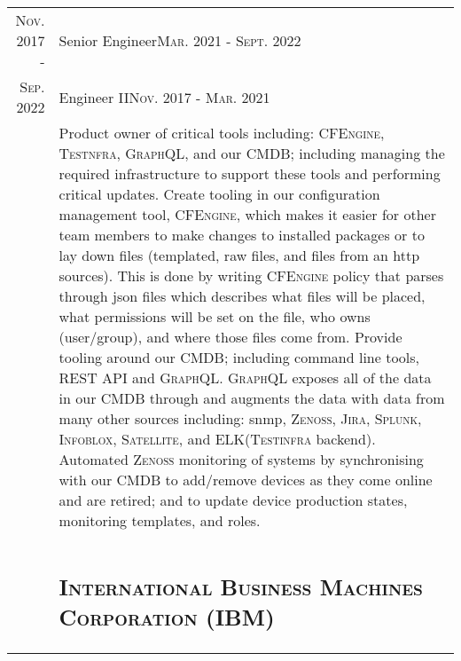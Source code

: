 \documentclass[letterpaper,10pt]{article}
\begin{document}
\begin{tabular}{R|B}
	\textsc{Nov.} 2017 -           & Senior Engineer\hfill\small{\textsc{Mar.} 2021 - \textsc{Sept.} 2022}                          \\
	\textsc{Sep.} 2022\phantom{ -} & Engineer II\hfill\small{\textsc{Nov.} 2017 - \textsc{Mar.} 2021}                               \\
	                               & \footnotesize Product owner of critical tools including: \textsc{CFEngine, Testnfra, GraphQL},
	and our CMDB; including managing the required infrastructure to support these tools and performing 	critical updates.
	Create tooling in our configuration management tool, \textsc{CFEngine}, which makes it easier for other team members
	to make changes to installed packages or to lay down files (templated, raw files, and files from an http sources).
	This is done by writing \textsc{CFEngine} policy that parses through json files which describes what files will be placed,
	what permissions will be set on the file, who owns (user/group), and where those files come from. Provide tooling around our CMDB;
	including command line tools, REST API and \textsc{GraphQL}. \textsc{GraphQL} exposes all of the data in our CMDB through and
	augments the data with data from many other sources including: snmp, \textsc{Zenoss, Jira, Splunk, Infoblox, Satellite},
	and \textsc{ELK}(\textsc{Testinfra} backend). Automated \textsc{Zenoss} monitoring of systems by synchronising with our
	CMDB to add/remove devices as they come online and are retired; and to update device production states, monitoring templates,
	and roles.                                                                                                                      \\
	                                                                                                            \\


	                               & \subsection{\textsc{International Business Machines Corporation (IBM)}}                        \\


\end{tabular}
\end{document}
